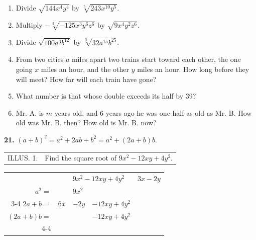 \documentclass{book}
\begin{document}
\begin{enumerate}
\item Divide $\sqrt{144 x^{4} y^{4}}$ by $\sqrt[5]{243 x^{10}
y^{5}}$.

\item Multiply $-\sqrt[3]{-125 x^{3} y^{6} z^{6}}$ by $\sqrt{9
x^{4} y^{2} z^{6}}$.

\item Divide $\sqrt{100 a^{6} b^{12}}$ by $\sqrt[5]{32 a^{15}
b^{25}}$.

\item From two cities $a$ miles apart two trains start toward each
other, the one going $x$ miles an hour, and the other $y$ miles an
hour. How long before they will meet? How far will each train have
gone?

\item What number is that whose double exceeds its half by 39?

\item Mr. A. is $m$ years old, and 6 years ago he was one-half as
old as Mr. B. How old was Mr. B. then? How old is Mr. B. now?
\end{enumerate}

\textbf{ 21.} $(a + b)^{2} = a^{2} + 2ab + b^{2} = a^{2} + (2a +
b)b$.

\begin{tabular}{lc}
ILLUS. 1. & Find the square root of $9x^{2} - 12 xy +4y^{2}$.\\
\end{tabular}

\begin{tabular} {rrccc}
 & & \multicolumn{2}{l|}{ $9x^{2} -12xy +4y^{2}$} & $3x-2y$ \\
$a^{2}=$& & \multicolumn{2}{l|}{$9x^{2}$} \\
\cline{3-4}
$2a+b=$ & $6x$&\multicolumn{1}{l|}{$ -2y$ }& $-12xy+4y^{2}$\\
$(2a+b)b=$ & \multicolumn{2}{c|}{}& $-12xy+4y^{2}$\\
\cline{4-4}
\end{tabular}
\end{document}
